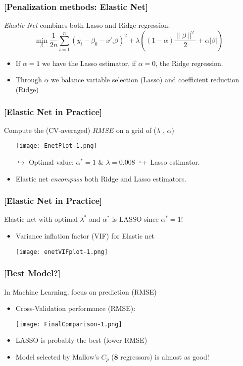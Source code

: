\documentclass[xcolor=x11names,compress, handhouts]{beamer}
\renewcommand{\(}{\begin{columns}}
\renewcommand{\)}{\end{columns}}
\newcommand{\<}[1]{\begin{column}{#1}}
\renewcommand{\>}{\end{column}}
\begin{document}
\begin{frame} %
\frametitle{\textcolor{brique}{[Penalization methods: Elastic Net]}}
\textit{Elastic Net} combines both Lasso and Ridge regression:
$$
\min_{\beta} \frac{1}{2n}
\sum_{i=1}^{n}{ \left( y_i - \beta_0 - x'_i\beta\right)^{2} } +
\lambda \left( (1-\alpha) \frac{ \|\beta\|^2}{2}  + \alpha |\beta| \right)
$$
\pause
\begin{itemize}[<+->]
\item If $\alpha=1$ we have the Lasso estimator, if  $\alpha=0$,  the Ridge regression.
\item Through $\alpha$ we balance variable selection (Lasso) and coefficient reduction (Ridge)
\end{itemize}
\end{frame}

\begin{frame} %
\frametitle{\textcolor{brique}{[Elastic Net in Practice]}}
Compute the (CV-averaged) $RMSE$ on a  grid of ($\lambda$ , $\alpha$)
\pause
\begin{itemize}[<+->]
\item[]  \texttt{[image: EnetPlot-1.png]}
\item[$\hookrightarrow$] Optimal value: $\alpha^* = 1$  \& $\lambda  = 0.008$  $\hookrightarrow$ Lasso estimator.
\item Elastic net \emph{encompass} both Ridge and Lasso estimators.
\end{itemize}
\end{frame}



\begin{frame} %
\frametitle{\textcolor{brique}{[Elastic Net in Practice]}}
Elastic net with  optimal $\lambda^*$ and $\alpha^*$ is LASSO since $\alpha^* = 1$! 
\pause
\begin{itemize}[<+->]
\item Variance inflation factor (VIF)  for Elastic net
\item[] \texttt{[image: enetVIFplot-1.png]}
\end{itemize}
\end{frame}


\begin{frame} %
\frametitle{\textcolor{brique}{[Best Model?]}}
In Machine Learning, focus on prediction  (RMSE) 
\pause
\begin{itemize}[<+->]
\item Cross-Validation performance (RMSE): 
\item[] \texttt{[image: FinalComparison-1.png]}
\item LASSO is probably the best (lower RMSE)
\item Model selected by Mallow's $C_p$  (\textbf{8} regressors) is almost as good! 
\end{itemize}
\end{frame}
\end{document}
